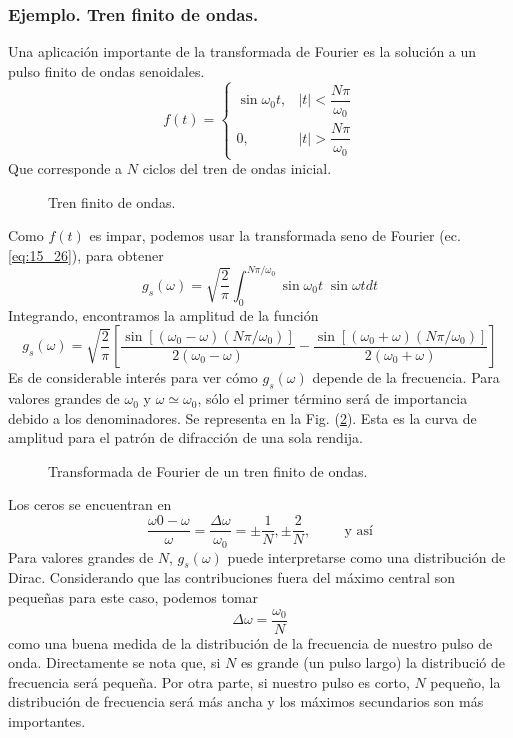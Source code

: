 \subsubsection{Ejemplo. Tren finito de ondas.}
Una aplicación importante de la transformada de Fourier es la solución a un pulso finito de ondas senoidales.
\begin{equation}
f(t) = \begin{cases}
\sin \omega_{0} t, & \vert t \vert < \dfrac{N \pi}{\omega_{0}} \\
0, & \vert t \vert > \dfrac{N \pi}{\omega_{0}}
\end{cases}
\label{eq_15_28}
\end{equation}
Que corresponde a $N$ ciclos del tren de ondas inicial.
\begin{figure}[H]
\centering

\caption{Tren finito de ondas.}
\label{fig:tren_finito}
\end{figure}
Como $f(t)$ es impar, podemos usar la transformada seno de Fourier (ec. \ref{eq:15_26}), para obtener
\begin{equation}
g_{s}(\omega) = \sqrt{\dfrac{2}{\pi}} \int_{0}^{N \pi / \omega_{0}} \sin \omega_{0} t \; \sin \omega t dt
\label{eq:15_29}
\end{equation}
Integrando, encontramos la amplitud de la función
\begin{equation}
g_{s} (\omega) = \sqrt{\dfrac{2}{\pi}} \left[ \dfrac{\sin[(\omega_{0} - \omega)(N \pi / \omega_{0})]}{2 (\omega_{0} - \omega)} - \dfrac{\sin[(\omega_{0} + \omega)(N \pi / \omega_{0})]}{2 (\omega_{0} + \omega)} \right]
\label{eq:15_30}
\end{equation}
Es de considerable interés para ver cómo $g_{s} (\omega)$ depende de la frecuencia. Para valores grandes de $\omega_{0}$ y $\omega \simeq \omega_{0}$, sólo el primer término será de importancia debido a los denominadores. Se representa en la Fig. (\ref{fig:TF_tren_finito}). Esta es la curva de amplitud para el patrón de difracción de una sola rendija.
\begin{figure}[H]
\centering

\caption{Transformada de Fourier de un tren finito de ondas.}
\label{fig:TF_tren_finito}
\end{figure}
Los ceros se encuentran en
\begin{equation}
\dfrac{ \omega{0} - \omega}{\omega} = \dfrac{\Delta \omega}{\omega_{0}} = \pm \dfrac{1}{N}, \pm \dfrac{2}{N}, \hspace{1cm} \text{y así}
\label{eq:15_31}
\end{equation}
Para valores grandes de $N$, $g_{s}(\omega)$ puede interpretarse como una distribución de Dirac. Considerando que las contribuciones fuera del máximo central son pequeñas para este caso, podemos tomar
\begin{equation}
\Delta \omega = \dfrac{\omega_{0}}{N}
\label{eq:15_32}
\end{equation}
como una buena medida de la distribución de la frecuencia de nuestro pulso de onda. Directamente se nota que, si $N$ es grande (un pulso largo) la distribució de frecuencia será pequeña. Por otra parte, si nuestro pulso es corto, $N$ pequeño, la distribución de frecuencia será más ancha y los máximos secundarios son más importantes.

